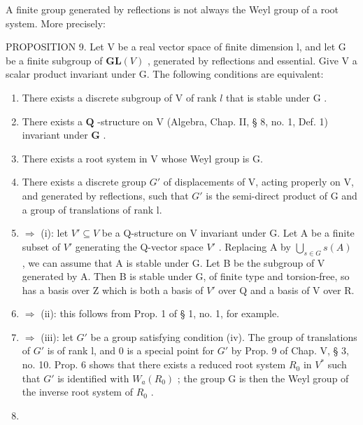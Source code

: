 A finite group generated by reflections is not always the Weyl group of a root system. More precisely:

PROPOSITION 9. Let V be a real vector space of finite dimension l, and let G be a finite subgroup of \(\mathbf{GL}(V)\) , generated by reflections and essential. Give V a scalar product invariant under G. The following conditions are equivalent:

\begin{enumerate}
\def\labelenumi{(\roman{enumi})}
\item
  There exists a discrete subgroup of \(\mathrm{V}\) of rank \(l\) that is stable under \(\mathrm{G}\) .
\item
  There exists a \(\mathbf{Q}\) -structure on V (Algebra, Chap. II, § 8, no. 1, Def. 1) invariant under \(\mathbf{G}\) .
\item
  There exists a root system in V whose Weyl group is G.
\item
  There exists a discrete group \(G'\) of displacements of V, acting properly on V, and generated by reflections, such that \(G'\) is the semi-direct product of G and a group of translations of rank l.
\item
  \(\Longrightarrow\) (i): let \(V' \subseteq V\) be a Q-structure on V invariant under G. Let A be a finite subset of \(V'\) generating the Q-vector space \(V'\) . Replacing A by \(\bigcup_{s \in G} s(A)\) , we can assume that A is stable under G. Let B be the subgroup of V generated by A. Then B is stable under G, of finite type and torsion-free, so has a basis over Z which is both a basis of \(V'\) over Q and a basis of V over R.
\item
  \(\Longrightarrow\) (ii): this follows from Prop. 1 of § 1, no. 1, for example.
\item
  \(\Longrightarrow\) (iii): let \(G'\) be a group satisfying condition (iv). The group of translations of \(G'\) is of rank l, and 0 is a special point for \(G'\) by Prop. 9 of Chap. V, § 3, no. 10. Prop. 6 shows that there exists a reduced root system \(R_{0}\) in \(V^{*}\) such that \(G'\) is identified with \(W_{a}(R_{0})\) ; the group G is then the Weyl group of the inverse root system of \(R_{0}\) .
\item

\end{enumerate}
